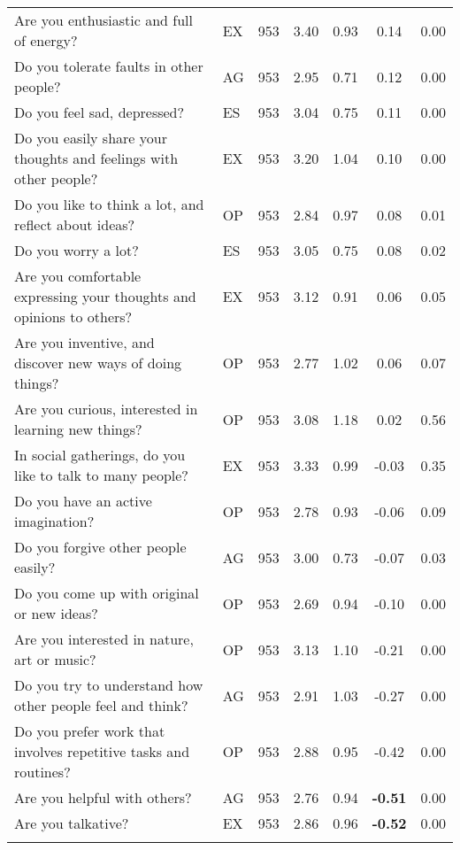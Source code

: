 \begin{table}[htbp]
{\begin{tabular}{llccccc}
    Are you enthusiastic and full of energy? & EX    & 953   & 3.40  & 0.93  & 0.14  & 0.00 \\
    Do you tolerate faults in other people? & AG    & 953   & 2.95  & 0.71  & 0.12  & 0.00 \\
    Do you feel sad, depressed? & ES    & 953   & 3.04  & 0.75  & 0.11  & 0.00 \\
    Do you easily share your thoughts and feelings with other people? & EX    & 953   & 3.20  & 1.04  & 0.10  & 0.00 \\
    Do you like to think a lot, and reflect about ideas? & OP    & 953   & 2.84  & 0.97  & 0.08  & 0.01 \\
    Do you worry a lot? & ES    & 953   & 3.05  & 0.75  & 0.08  & 0.02 \\
    Are you comfortable expressing your thoughts and opinions to others? & EX    & 953   & 3.12  & 0.91  & 0.06  & 0.05 \\
    Are you inventive, and discover new ways of doing things? & OP    & 953   & 2.77  & 1.02  & 0.06  & 0.07 \\
    Are you curious, interested in learning new things? & OP    & 953   & 3.08  & 1.18  & 0.02  & 0.56 \\
    In social gatherings, do you like to talk to many people? & EX    & 953   & 3.33  & 0.99  & -0.03 & 0.35 \\
    Do you have an active imagination? & OP    & 953   & 2.78  & 0.93  & -0.06 & 0.09 \\
    Do you forgive other people easily? & AG    & 953   & 3.00  & 0.73  & -0.07 & 0.03 \\
    Do you come up with original or new ideas? & OP    & 953   & 2.69  & 0.94  & -0.10 & 0.00 \\
    Are you interested in nature, art or music? & OP    & 953   & 3.13  & 1.10  & -0.21 & 0.00 \\
    Do you try to understand how other people feel and think? & AG    & 953   & 2.91  & 1.03  & -0.27 & 0.00 \\
    Do you prefer work that involves repetitive tasks and routines? & OP    & 953   & 2.88  & 0.95  & -0.42 & 0.00 \\
    Are you helpful with others? & AG    & 953   & 2.76  & 0.94  & \textbf{-0.51} & 0.00 \\
    Are you talkative? & EX    & 953   & 2.86  & 0.96  & \textbf{-0.52} & 0.00 \\
    \bottomrule
	\Tablenote{7}{Most contributive \textbf{variables} are used to interpret factor: threshold at 0.5.} \\
    \end{tabular}%
	}
  \label{tab:factor3}%
\end{table}%
